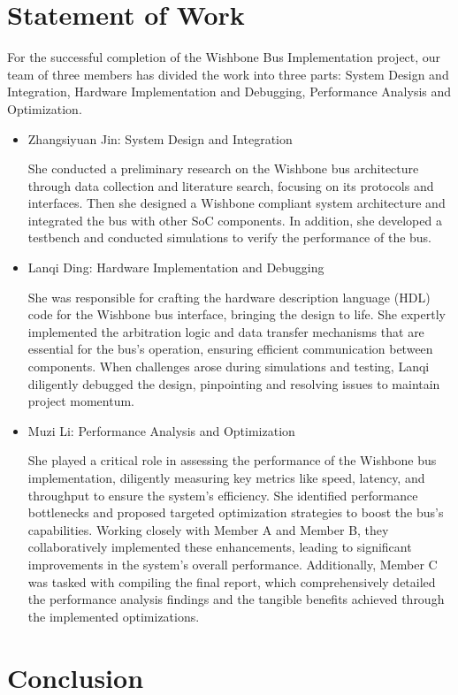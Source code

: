 \documentclass[conference]{IEEEtran}
\begin{document}
\section{Statement of Work}
For the successful completion of the Wishbone Bus Implementation project, our team of three members has divided the work into three parts: System Design and Integration, Hardware Implementation and Debugging, Performance Analysis and Optimization.

\begin{itemize}
    \item Zhangsiyuan Jin: System Design and Integration

    She conducted a preliminary research on the Wishbone bus architecture through data collection and literature search, focusing on its protocols and interfaces. Then she designed a Wishbone compliant system architecture and integrated the bus with other SoC components. In addition, she developed a testbench and conducted simulations to verify the performance of the bus.

    \item Lanqi Ding: Hardware Implementation and Debugging

    She was responsible for crafting the hardware description language (HDL) code for the Wishbone bus interface, bringing the design to life. She expertly implemented the arbitration logic and data transfer mechanisms that are essential for the bus's operation, ensuring efficient communication between components. When challenges arose during simulations and testing, Lanqi diligently debugged the design, pinpointing and resolving issues to maintain project momentum. 

    \item Muzi Li: Performance Analysis and Optimization

    She played a critical role in assessing the performance of the Wishbone bus implementation, diligently measuring key metrics like speed, latency, and throughput to ensure the system's efficiency. She identified performance bottlenecks and proposed targeted optimization strategies to boost the bus's capabilities. Working closely with Member A and Member B, they collaboratively implemented these enhancements, leading to significant improvements in the system's overall performance. Additionally, Member C was tasked with compiling the final report, which comprehensively detailed the performance analysis findings and the tangible benefits achieved through the implemented optimizations.

\end{itemize}


\section{Conclusion}










\printbibliography[title={References},resetnumbers=true,heading=subbibliography]
\clearpage
\end{document}

